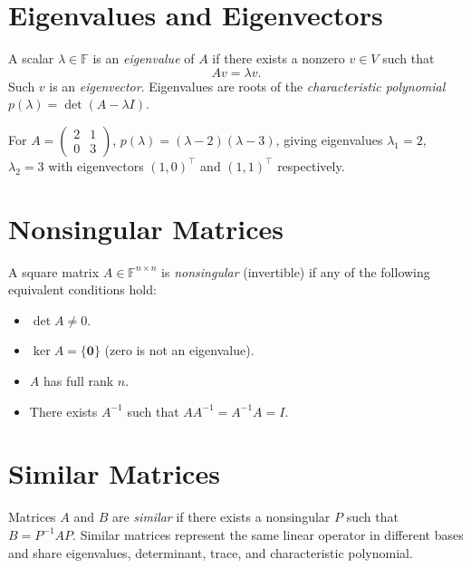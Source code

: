 \section{Eigenvalues and Eigenvectors}

A scalar $\lambda\in\mathbb{F}$ is an \emph{eigenvalue} of $A$ if there exists a nonzero $v\in V$ such that
\[
  Av = \lambda v.
\]
Such $v$ is an \emph{eigenvector}. Eigenvalues are roots of the \emph{characteristic polynomial} $p(\lambda)=\det(A-\lambda I)$.

\begin{example}
For $A=\begin{pmatrix}2&1\\0&3\end{pmatrix}$, $p(\lambda)=(\lambda-2)(\lambda-3)$, giving eigenvalues $\lambda_1=2$, $\lambda_2=3$ with eigenvectors $(1,0)^\top$ and $(1,1)^\top$ respectively.
\end{example}

\section{Nonsingular Matrices}

A square matrix $A\in\mathbb{F}^{n\times n}$ is \emph{nonsingular} (invertible) if any of the following equivalent conditions hold:
\begin{itemize}
  \item $\det A \neq 0$.
  \item $\ker A = \{\mathbf{0}\}$ (zero is not an eigenvalue).
  \item $A$ has full rank $n$.
  \item There exists $A^{-1}$ such that $AA^{-1}=A^{-1}A=I$.
\end{itemize}

\section{Similar Matrices}

Matrices $A$ and $B$ are \emph{similar} if there exists a nonsingular $P$ such that $B=P^{-1}AP$. Similar matrices represent the same linear operator in different bases and share eigenvalues, determinant, trace, and characteristic polynomial.


